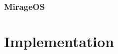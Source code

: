 \documentclass{beamer}
\begin{document}
\begin{frame}
    \frametitle{MirageOS}
    \begin{center}
    \end{center}
\end{frame}

\section{Implementation}
\end{document}
